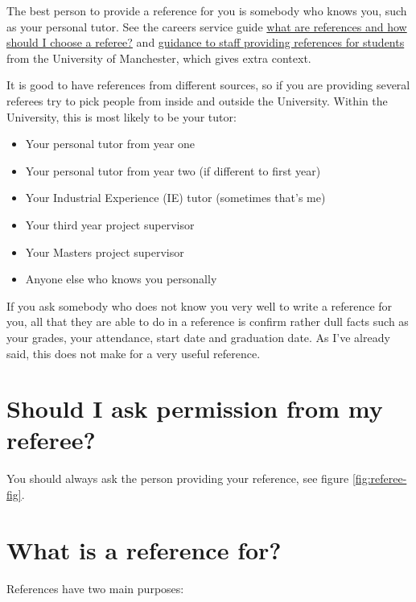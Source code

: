 \documentclass[
  12pt,
]{book}
\providecommand{\tightlist}{%
  \setlength{\itemsep}{0pt}\setlength{\parskip}{0pt}}
\begin{document}
The best person to provide a reference for you is somebody who knows you, such as your personal tutor. See the careers service guide \href{http://www.careers.manchester.ac.uk/applicationsinterviews/faqs/references}{what are references and how should I choose a referee?} and \href{http://documents.manchester.ac.uk/display.aspx?DocID=1921}{guidance to staff providing references for students} from the University of Manchester, which gives extra context.

It is good to have references from different sources, so if you are providing several referees try to pick people from inside and outside the University. Within the University, this is most likely to be your tutor:

\begin{itemize}
\tightlist
\item
  Your personal tutor from year one
\item
  Your personal tutor from year two (if different to first year)
\item
  Your Industrial Experience (IE) tutor (sometimes that's me)
\item
  Your third year project supervisor
\item
  Your Masters project supervisor
\item
  Anyone else who knows you personally
\end{itemize}

If you ask somebody who does not know you very well to write a reference for you, all that they are able to do in a reference is confirm rather dull facts such as your grades, your attendance, start date and graduation date. As I've already said, this does not make for a very useful reference.

\hypertarget{should-i-ask-permission-from-my-referee}{%
\section{Should I ask permission from my referee?}\label{should-i-ask-permission-from-my-referee}}

You should always ask the person providing your reference, see figure \ref{fig:referee-fig}.

\hypertarget{what-is-a-reference-for}{%
\section{What is a reference for?}\label{what-is-a-reference-for}}

References have two main purposes:
\end{document}
